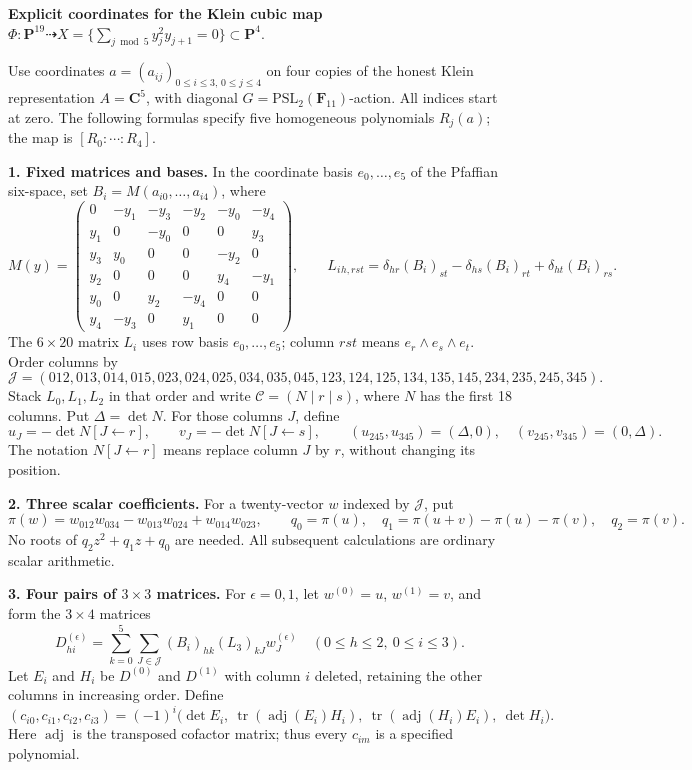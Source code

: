 \documentclass[11pt]{article}
\DeclareMathOperator{\adj}{adj}
\DeclareMathOperator{\tr}{tr}
\newcommand{\PP}{\mathbf P}
\begin{document}
\begin{center}
{\Large\bfseries Explicit coordinates for the Klein cubic map}\\[3pt]
$\displaystyle \Phi:\PP^{19}\dashrightarrow X=\bigl\{\textstyle\sum_{j\bmod5}y_j^2y_{j+1}=0\bigr\}\subset\PP^4.$
\end{center}
\vspace{-4pt}
Use coordinates $a=(a_{ij})_{0\le i\le3,\,0\le j\le4}$ on four copies of the honest Klein representation
$A=\mathbf C^5$, with diagonal $G=\mathrm{PSL}_2(\mathbf F_{11})$-action. All indices start at zero.
The following formulas specify five homogeneous polynomials $R_j(a)$; the map is $[R_0:\cdots:R_4]$.

\textbf{1. Fixed matrices and bases.}
In the coordinate basis $e_0,\ldots,e_5$ of the Pfaffian six-space, set $B_i=M(a_{i0},\ldots,a_{i4})$, where
\[
M(y)=\begin{pmatrix}
0&-y_1&-y_3&-y_2&-y_0&-y_4\\
y_1&0&-y_0&0&0&y_3\\
y_3&y_0&0&0&-y_2&0\\
y_2&0&0&0&y_4&-y_1\\
y_0&0&y_2&-y_4&0&0\\
y_4&-y_3&0&y_1&0&0
\end{pmatrix},\qquad
L_i{}_{h,rst}=\delta_{hr}(B_i)_{st}-\delta_{hs}(B_i)_{rt}+\delta_{ht}(B_i)_{rs}.
\]
The $6\times20$ matrix $L_i$ uses row basis $e_0,\ldots,e_5$; column $rst$ means $e_r\wedge e_s\wedge e_t$.
Order columns by
\[
\mathcal J=(012,013,014,015,023,024,025,034,035,045,
123,124,125,134,135,145,234,235,245,345).
\]
Stack $L_0,L_1,L_2$ in that order and write $\mathcal C=(N\mid r\mid s)$, where $N$ has the first
18 columns. Put $\Delta=\det N$. For those columns $J$, define
\[
u_J=-\det N[J\leftarrow r],\qquad v_J=-\det N[J\leftarrow s],\qquad
(u_{245},u_{345})=(\Delta,0),\quad(v_{245},v_{345})=(0,\Delta).
\]
The notation $N[J\leftarrow r]$ means replace column $J$ by $r$, without changing its position.

\textbf{2. Three scalar coefficients.}
For a twenty-vector $w$ indexed by $\mathcal J$, put
\[
\pi(w)=w_{012}w_{034}-w_{013}w_{024}+w_{014}w_{023},\qquad
q_0=\pi(u),\quad q_1=\pi(u+v)-\pi(u)-\pi(v),\quad q_2=\pi(v).
\]
No roots of $q_2z^2+q_1z+q_0$ are needed. All subsequent calculations are ordinary scalar arithmetic.

\textbf{3. Four pairs of $3\times3$ matrices.}
For $\epsilon=0,1$, let $w^{(0)}=u$, $w^{(1)}=v$, and form the $3\times4$ matrices
\[
D^{(\epsilon)}_{hi}=\sum_{k=0}^5\sum_{J\in\mathcal J}(B_i)_{hk}(L_3)_{kJ}w^{(\epsilon)}_J
\quad(0\le h\le2,\ 0\le i\le3).
\]
Let $E_i$ and $H_i$ be $D^{(0)}$ and $D^{(1)}$ with column $i$ deleted, retaining the other columns
in increasing order. Define
\[
(c_{i0},c_{i1},c_{i2},c_{i3})=(-1)^i
\bigl(\det E_i,\ \tr(\adj(E_i)H_i),\ \tr(\adj(H_i)E_i),\ \det H_i\bigr).
\]
Here $\adj$ is the transposed cofactor matrix; thus every $c_{im}$ is a specified polynomial.
\end{document}
